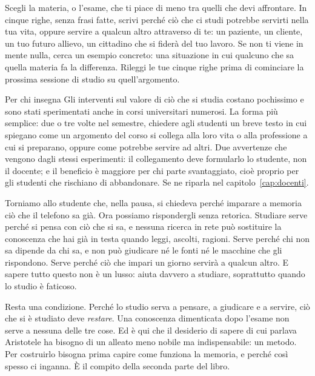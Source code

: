 \begin{esercizio}
Scegli la materia, o l'esame, che ti piace di meno tra quelli che devi
affrontare. In cinque righe, senza frasi fatte, scrivi perché ciò che
ci studi potrebbe servirti nella tua vita, oppure servire a qualcun
altro attraverso di te: un paziente, un cliente, un tuo futuro allievo,
un cittadino che si fiderà del tuo lavoro. Se non ti viene in mente
nulla, cerca un esempio concreto: una situazione in cui qualcuno che sa
quella materia fa la differenza. Rileggi le tue cinque righe prima di
cominciare la prossima sessione di studio su quell'argomento.
\end{esercizio}

\begin{riquadro}{Per chi insegna}
Gli interventi sul valore di ciò che si studia costano pochissimo e sono
stati sperimentati anche in corsi universitari numerosi. La forma più
semplice: due o tre volte nel semestre, chiedere agli studenti un breve
testo in cui spiegano come un argomento del corso si collega alla loro
vita o alla professione a cui si preparano, oppure come potrebbe servire
ad altri. Due avvertenze che vengono dagli stessi esperimenti: il
collegamento deve formularlo lo studente, non il docente; e il
beneficio è maggiore per chi parte svantaggiato, cioè proprio per gli
studenti che rischiano di abbandonare. Se ne riparla nel
capitolo~\ref{cap:docenti}.
\end{riquadro}

\asterismo

Torniamo allo studente che, nella pausa, si chiedeva perché imparare a
memoria ciò che il telefono sa già. Ora possiamo rispondergli senza
retorica. Studiare serve perché si pensa con ciò che si sa, e nessuna
ricerca in rete può sostituire la conoscenza che hai già in testa quando
leggi, ascolti, ragioni. Serve perché chi non sa dipende da chi sa, e
non può giudicare né le fonti né le macchine che gli rispondono. Serve
perché ciò che impari un giorno servirà a qualcun altro. E sapere tutto
questo non è un lusso: aiuta davvero a studiare, soprattutto quando lo
studio è faticoso.

Resta una condizione. Perché lo studio serva a pensare, a giudicare e a
servire, ciò che si è studiato deve \emph{restare}. Una conoscenza
dimenticata dopo l'esame non serve a nessuna delle tre cose. Ed è qui
che il desiderio di sapere di cui parlava Aristotele ha bisogno di un
alleato meno nobile ma indispensabile: un metodo. Per costruirlo bisogna
prima capire come funziona la memoria, e perché così spesso ci inganna.
È il compito della seconda parte del libro.

